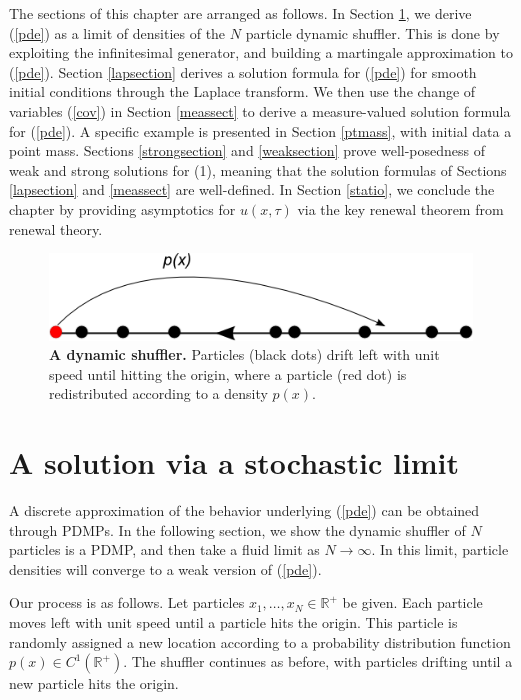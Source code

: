 The sections of this chapter are arranged as follows.  In Section \ref{stochlimit}, we derive (\ref{pde}) as a limit of densities of the $N$ particle dynamic shuffler. This is done by exploiting the infinitesimal generator, and building a martingale approximation to (\ref{pde}). Section \ref{lapsection} derives a solution formula for (\ref{pde}) for smooth initial conditions through the Laplace transform.
We then use the change of variables (\ref{cov}) in Section \ref{meassect} to derive a measure-valued solution formula for (\ref{pde}).  A specific example is presented in  Section \ref{ptmass}, with initial data a point mass. Sections \ref{strongsection} and \ref{weaksection} prove well-posedness of weak and strong solutions for (1), meaning that the solution formulas of Sections \ref{lapsection} and \ref{meassect} are well-defined. In  Section \ref{statio}, we conclude the chapter by   providing asymptotics for $u(x,\tau)$ via the key renewal theorem from renewal theory. 


  
    
\begin{figure}
\begin{centering}
\includegraphics[width=.5\textwidth]{1dredistribution.png}
\caption{\textbf{A dynamic shuffler.} Particles (black dots) drift left with unit speed until hitting the origin, where a particle (red dot) is redistributed according to a density $p(x)$.}
\end{centering}
\end{figure}


    

 
\section{A solution via a stochastic limit}\label{stochlimit}
A discrete approximation of the behavior underlying  (\ref{pde}) can be obtained through PDMPs.  In the following section, we show the dynamic shuffler of $N$ particles is a PDMP, and then take a fluid limit as $N \rightarrow \infty$. In this limit, particle densities will converge to a weak version of (\ref{pde}).    

 

Our process is as follows.  Let particles $x_1, \dots, x_N \in \mathbb{R}^+$ be given. Each particle moves left with unit speed until a particle hits the origin.  This particle is randomly assigned a new location according to a probability distribution function $p(x) \in C^1(\mathbb{R}^+)$. The shuffler continues as before, with particles drifting until a new particle hits the origin. 


